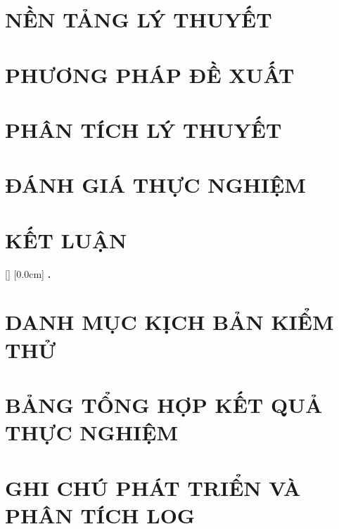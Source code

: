 \documentclass[a4paper,twoside]{report}
\numberwithin{equation}{chapter}
\theoremstyle{definition}
\begin{document}
\newpage
\chapter{NỀN TẢNG LÝ THUYẾT}


\newpage
\chapter{PHƯƠNG PHÁP ĐỀ XUẤT}


\newpage
\chapter{PHÂN TÍCH LÝ THUYẾT}


\newpage
\chapter{ĐÁNH GIÁ THỰC NGHIỆM}


\newpage
\chapter{KẾT LUẬN}


\newpage

\printbibliography[title={TÀI LIỆU THAM KHẢO}]

\appendixpage
\appendix
\addappheadtotoc
{}[]
\titlespacing*{\chapter}{0pt}{-20pt}{20pt}
    [0.0cm]
    {\bfseries\vspace{0.3cm}}
    {{\bfseries{\scshape} \thecontentslabel.\ }}
    {}
    {\contentspage}

\chapter{DANH MỤC KỊCH BẢN KIỂM THỬ}


\newpage
\chapter{BẢNG TỔNG HỢP KẾT QUẢ THỰC NGHIỆM}


\newpage
\chapter{GHI CHÚ PHÁT TRIỂN VÀ PHÂN TÍCH LOG}

\end{document}
